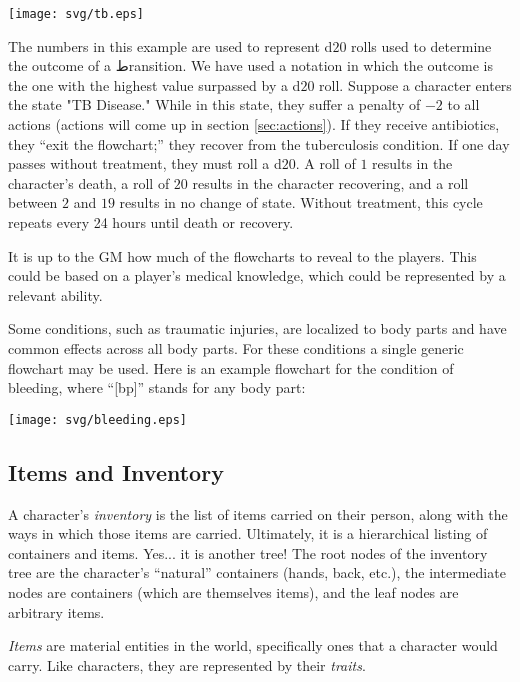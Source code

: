 \documentclass[12pt]{article}
\newcommand{\emdex}[1]{\emph{#1}\index{#1}}
\begin{document}
\begin{center} \texttt{[image: svg/tb.eps]} \end{center}

The numbers in this example are used to represent d$20$ rolls used to determine the outcome of a طransition. 
We have used a notation in which the outcome is the one with the highest value surpassed by a d$20$ roll.
Suppose a character enters the state "TB Disease."
While in this state, they suffer a penalty of $-2$ to all actions (actions will come up in section \ref{sec:actions}).
If they receive antibiotics, they ``exit the flowchart;'' they recover from the tuberculosis condition.
If one day passes without treatment, they must roll a d$20$.
A roll of $1$ results in the character's death, a roll of $20$ results in the character recovering,
and a roll between $2$ and $19$ results in no change of state.
Without treatment, this cycle repeats every 24 hours until death or recovery.

It is up to the GM how much of the flowcharts to reveal to the players.
This could be based on a player's medical knowledge, which could be represented by a relevant ability.

Some conditions, such as traumatic injuries, are localized to body parts and have common effects across all body parts.
For these conditions a single generic flowchart may be used. Here is an example flowchart for the condition of bleeding,
where ``[bp]'' stands for any body part:
\begin{center} \texttt{[image: svg/bleeding.eps]} \end{center}


\subsection{Items and Inventory} \label{sec:items}
A character's \emdex{inventory} is the list of items carried on their person,
along with the ways in which those items are carried.
Ultimately, it is a hierarchical listing of containers and items.
Yes... it is another tree!
The root nodes of the inventory tree are the character's ``natural'' containers (hands, back, etc.),
the intermediate nodes are containers (which are themselves items),
and the leaf nodes are arbitrary items.

\emph{Items} are material entities in the world, 
specifically ones that a character would carry.
Like characters, they are represented by their \emph{traits}.
\end{document}
